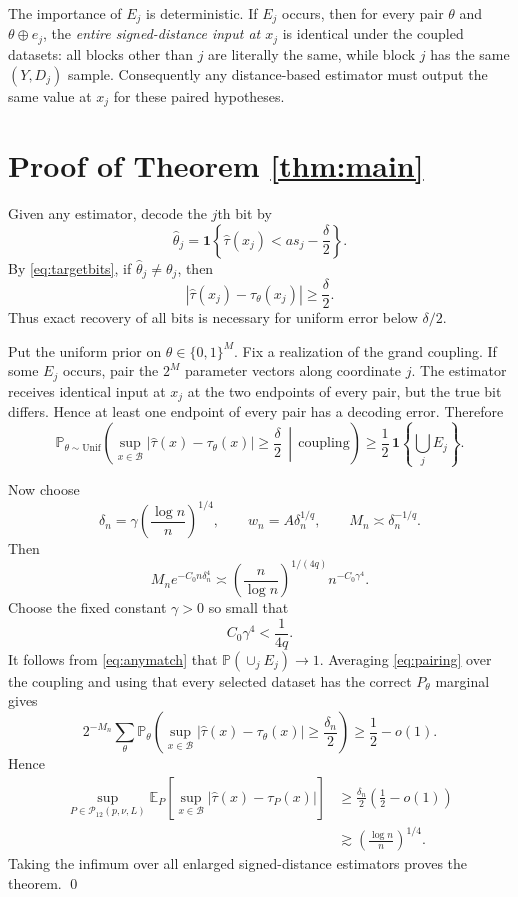 \documentclass[11pt]{article}
\newcommand{\E}{\mathbb E}
\newcommand{\Pp}{\mathbb P}
\newcommand{\cB}{\mathcal B}
\newcommand{\1}{\mathbf 1}
\begin{document}
The importance of $E_j$ is deterministic.  If $E_j$ occurs, then for every pair $\theta$ and $\theta\oplus e_j$, the \emph{entire signed-distance input at $x_j$} is identical under the coupled datasets: all blocks other than $j$ are literally the same, while block $j$ has the same $(Y,D_j)$ sample.  Consequently any distance-based estimator must output the same value at $x_j$ for these paired hypotheses.

\section{Proof of Theorem \ref{thm:main}}

Given any estimator, decode the $j$th bit by
\[
\widehat\theta_j
=\1\left\{\widehat\tau(x_j)<a s_j-\frac\delta2\right\}.
\]
By \eqref{eq:targetbits}, if $\widehat\theta_j\ne\theta_j$, then
\[
|\widehat\tau(x_j)-\tau_\theta(x_j)|\ge\frac\delta2.
\]
Thus exact recovery of all bits is necessary for uniform error below $\delta/2$.

Put the uniform prior on $\theta\in\{0,1\}^M$.  Fix a realization of the grand coupling.  If some $E_j$ occurs, pair the $2^M$ parameter vectors along coordinate $j$.  The estimator receives identical input at $x_j$ at the two endpoints of every pair, but the true bit differs.  Hence at least one endpoint of every pair has a decoding error.  Therefore
\begin{equation}
\Pp_{\theta\sim\mathrm{Unif}}
\left(
\sup_{x\in\cB}|\widehat\tau(x)-\tau_\theta(x)|\ge\frac\delta2
\,\middle|\,\text{coupling}
\right)
\ge\frac12\,\1\left\{\bigcup_jE_j\right\}.                 \label{eq:pairing}
\end{equation}

Now choose
\[
\delta_n=\gamma\left(\frac{\log n}{n}\right)^{1/4},
\qquad
w_n=A\delta_n^{1/q},
\qquad
M_n\asymp\delta_n^{-1/q}.
\]
Then
\[
M_n e^{-C_0n\delta_n^4}
\asymp
\left(\frac{n}{\log n}\right)^{1/(4q)}n^{-C_0\gamma^4}.
\]
Choose the fixed constant $\gamma>0$ so small that
\[
C_0\gamma^4<\frac1{4q}.
\]
It follows from \eqref{eq:anymatch} that $\Pp(\cup_jE_j)\to1$.  Averaging \eqref{eq:pairing} over the coupling and using that every selected dataset has the correct $P_\theta$ marginal gives
\[
2^{-M_n}\sum_\theta
\Pp_\theta\left(
\sup_{x\in\cB}|\widehat\tau(x)-\tau_\theta(x)|\ge\frac{\delta_n}{2}
\right)
\ge \frac12-o(1).
\]
Hence
\begin{align*}
\sup_{P\in\mathcal P_{12}(p,\nu,L)}
\E_P\!\left[\sup_{x\in\cB}|\widehat\tau(x)-\tau_P(x)|\right]
&\ge
\frac{\delta_n}{2}\left(\frac12-o(1)\right)\\
&\gtrsim
\left(\frac{\log n}{n}\right)^{1/4}.
\end{align*}
Taking the infimum over all enlarged signed-distance estimators proves the theorem. \qed
\end{document}
